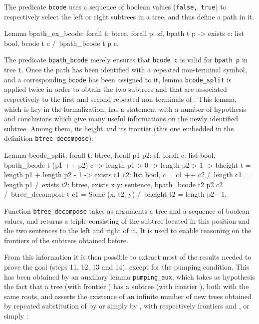 \documentclass {elsarticle}
\begin{document}
The predicate \texttt {bcode} uses a sequence of boolean values (\texttt {false, true}) to respectively select the left or right subtrees in a tree, and thus define a path in it.

\begin{coq}
Lemma bpath_ex_bcode:
forall t: btree,
forall p: sf,
bpath t p -> 
exists c: list bool,
bcode t c /\
bpath_bcode t p c.
\end{coq}

The predicate \texttt {bpath\_bcode} merely ensures that \texttt {bcode c} is valid for \texttt {bpath p} in tree \texttt {t}. Once the path has been identified with a repeated non-terminal symbol, and a corresponding \texttt {bcode} has been assigned to it, lemma \texttt {bcode\_split} is applied twice in order to obtain the two subtrees  and  that are associated respectively to the first and second repeated non-terminals of . This lemma, which is key in the formalization, has a statement with a number of hypothesis and conclusions which give many useful informations on the newly identified subtree. Among them, its height and its frontier (this one embedded in the definition \texttt {btree\_decompose}):

\begin{coq}
Lemma bcode_split:
forall t: btree,
forall p1 p2: sf,
forall c: list bool,
bpath_bcode t (p1 ++ p2) c ->
length p1 > 0 ->
length p2 > 1 ->
bheight t = length p1 + length p2 - 1 ->
exists c1 c2: list bool,
c = c1 ++ c2 /\
length c1 = length p1 /\
exists t2: btree,
exists x y: sentence,
bpath_bcode t2 p2 c2 /\
btree_decompose t c1 = Some (x, t2, y) /\
bheight t2 = length p2 - 1.
\end{coq}

Function \texttt {btree\_decompose} takes as arguments a tree and a sequence of boolean values, and returns a triple consisting of the subtree located in this position and the two sentences to the left and right of it. It is used to enable reasoning on the frontiers of the subtrees obtained before.

From this information it is then possible to extract most of the results needed to prove the goal (steps 11, 12, 13 and 14), except for the pumping condition. This has been obtained by an auxiliary lemma \texttt {pumping\_aux}, which takes as hypothesis the fact that a tree  (with frontier ) has a subtree  (with frontier ), both with the same roots, and asserts the existence of an infinite number of new trees obtained by repeated substitution of  by  or simply  by , with respectively frontiers  and , or simply :
\end{document}
